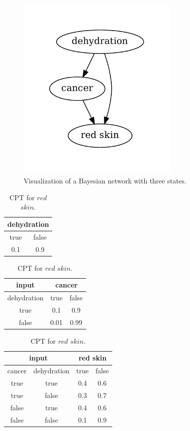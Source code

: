 \documentclass[thesis=B,english]{FITthesis}[2012/06/26]
\begin{document}
\begin{figure}
	\centering
 	\includegraphics[width=0.7\textwidth]{bn}
 	\caption{Visualization of a Bayesian network with three states.}
 	\label{fig:bn}
\end{figure}

\begin{table}
\parbox{0.45\linewidth}{
\centering
\begin{tabular}{|c|c|}
\hline
\multicolumn{2}{|c|}{dehydration}  \\
\hline
true & false \\
\hline
0.1 & 0.9 \\
\hline
\end{tabular}
\caption{CPT for $dehydration$.}
}
\hfill
\parbox{0.45\linewidth}{
\centering
\begin{tabular}{|c||c|c|}
\hline
input & \multicolumn{2}{c|}{cancer} \\
\hline
dehydration & true & false \\
\hline
true & 0.1 & 0.9 \\
\hline
false & 0.01 & 0.99 \\
\hline
\end{tabular}
\caption{CPT for $cancer$.}
}
\centering
\begin{tabular}{|c|c||c|c|}
\hline
\multicolumn{2}{|c||}{input} & \multicolumn{2}{c|}{red skin} \\
\hline
cancer & dehydration & true & false \\
\hline
true & true & 0.4 & 0.6 \\
\hline
true & false & 0.3 & 0.7 \\
\hline
false & true & 0.4 & 0.6 \\
\hline
false & false & 0.1 & 0.9 \\
\hline
\end{tabular}
\caption{CPT for $red$ $skin$.}
\end{table}
\end{document}
